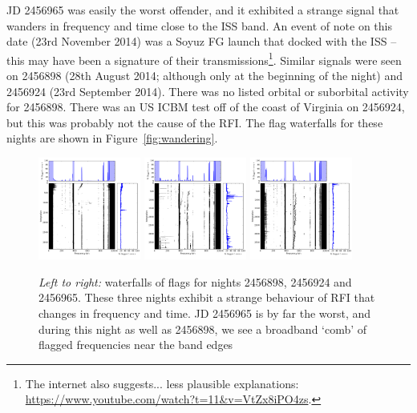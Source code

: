 JD 2456965 was easily the worst offender, and it exhibited a strange signal that wanders in frequency and time close to the ISS band. An event of note on this date (23rd November 2014) was a Soyuz FG launch that docked with the ISS -- this may have been a signature of their transmissions\footnote{The internet also suggests... less plausible explanations: \url{https://www.youtube.com/watch?t=11&v=VtZx8iPO4zs}. }.
Similar signals were seen on 2456898 (28th August 2014; although only at the beginning of the night) and 2456924 (23rd September 2014). There was no listed orbital or suborbital activity for 2456898. There was an US ICBM test off of the coast of Virginia on 2456924, but this was probably not the cause of the RFI. The flag waterfalls for these nights are shown in Figure~\ref{fig:wandering}.\\

\begin{figure}[h!]
\centering
\includegraphics[width=0.3\textwidth]{chapters/data_processing/figures/2456898RFI.png}
\includegraphics[width=0.3\textwidth]{chapters/data_processing/figures/2456924RFI.png}
\includegraphics[width=0.3\textwidth]{chapters/data_processing/figures/2456965RFI.png}
\caption[Waterfalls of RFI flags for nights 2456898, 2456924 and 2456965]{\textit{Left to right:} waterfalls of flags for nights 2456898, 2456924 and 2456965. These three nights exhibit a strange behaviour of RFI that changes in frequency and time. JD 2456965 is by far the worst, and during this night as well as 2456898, we see a broadband `comb' of flagged frequencies near the band edges}
\label{fig:rfi_psa128_wandering}
\end{figure}

